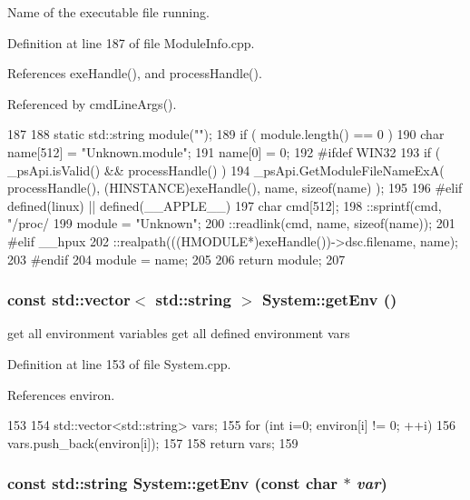 Name of the executable file running. 

Definition at line 187 of file ModuleInfo.cpp.

References exeHandle(), and processHandle().

Referenced by cmdLineArgs().


\begin{DoxyCode}
187                                     {
188   static std::string module("");
189   if ( module.length() == 0 )    {
190     char name[512] = {"Unknown.module"};
191     name[0] = 0;
192 #ifdef WIN32
193     if ( _psApi.isValid() && processHandle() )   {
194       _psApi.GetModuleFileNameExA( processHandle(), (HINSTANCE)exeHandle(), name,
      sizeof(name) );
195     }
196 #elif defined(linux) || defined(__APPLE__)
197     char cmd[512];
198     ::sprintf(cmd, "/proc/%
199     module = "Unknown";
200     ::readlink(cmd, name, sizeof(name));
201 #elif __hpux
202     ::realpath(((HMODULE*)exeHandle())->dsc.filename, name);
203 #endif
204     module = name;
205   }
206   return module;
207 }
\end{DoxyCode}
\hypertarget{namespaceSystem_a072d542bc6ae51093df9c93db06f4e2d}{
\subsubsection[{getEnv}]{\setlength{\rightskip}{0pt plus 5cm}const std::vector$<$ std::string $>$ System::getEnv ()}}
\label{namespaceSystem_a072d542bc6ae51093df9c93db06f4e2d}


get all environment variables get all defined environment vars 

Definition at line 153 of file System.cpp.

References environ.


\begin{DoxyCode}
153                                           {
154   std::vector<std::string> vars;
155   for (int i=0; environ[i] != 0; ++i) {
156     vars.push_back(environ[i]);
157   }
158   return vars;
159 }
\end{DoxyCode}
\hypertarget{namespaceSystem_af83af19ba6c1083e5643390dfd65f7aa}{
\subsubsection[{getEnv}]{\setlength{\rightskip}{0pt plus 5cm}const std::string System::getEnv (const char $\ast$ {\em var})}}
\label{namespaceSystem_af83af19ba6c1083e5643390dfd65f7aa}


